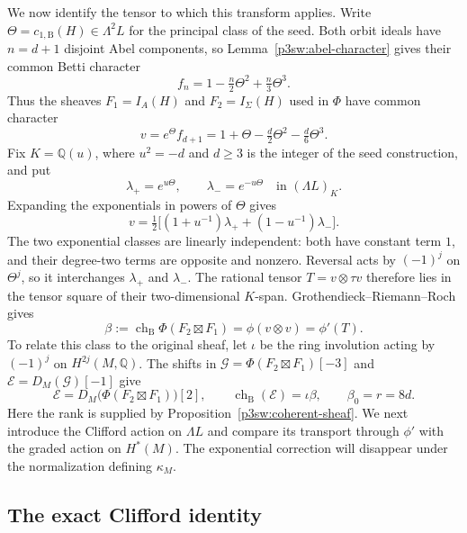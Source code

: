 \documentclass[11pt]{article}
\newcommand{\Q}{\mathbb Q}
\numberwithin{equation}{section}
\begin{document}
We now identify the tensor to which this transform applies.  Write
\(\Theta=c_{1,\mathrm B}(H)\in\Lambda^2L\) for the principal class
of the seed.  Both orbit ideals have \(n=d+1\) disjoint Abel
components, so Lemma~\ref{p3sw:abel-character} gives their common
Betti character
\[
 f_n=1-\tfrac n2\Theta^2+\tfrac n3\Theta^3.
\]
Thus the sheaves \(F_1=I_A(H)\) and \(F_2=I_\Sigma(H)\) used in
\(\Phi\) have common character
\[
 v=e^\Theta f_{d+1}
   =1+\Theta-\tfrac d2\Theta^2-\tfrac d6\Theta^3.
\]
Fix \(K=\Q(u)\), where \(u^2=-d\) and \(d\geq3\) is the integer
of the seed construction, and put
\[
 \lambda_+=e^{u\Theta},\qquad \lambda_-=e^{-u\Theta}
       \quad\text{in }(\Lambda L)_K.
\]
Expanding the exponentials in powers of \(\Theta\) gives
\begin{equation}
\label{p3sw:spin-eq:source-character}
 v=\tfrac12\bigl[(1+u^{-1})\lambda_+
                    +(1-u^{-1})\lambda_-\bigr].
\end{equation}
The two exponential classes are linearly independent: both have
constant term \(1\), and their degree-two terms are opposite and
nonzero.  Reversal acts by \((-1)^j\) on \(\Theta^j\), so it
interchanges \(\lambda_+\) and \(\lambda_-\).  The rational tensor
\(T=v\otimes\tau v\) therefore lies in the tensor square of their
two-dimensional \(K\)-span.  Grothendieck--Riemann--Roch gives
\begin{equation}
\label{p3sw:spin-eq:sheaf-transform}
 \beta:=\operatorname{ch}_{\mathrm B}\Phi(F_2\boxtimes F_1)
       =\phi(v\otimes v)=\phi'(T).
\end{equation}
To relate this class to the original sheaf, let \(\iota\) be the
ring involution acting by \((-1)^j\) on \(H^{2j}(M,\Q)\).
The shifts in \(\mathcal G=\Phi(F_2\boxtimes F_1)[-3]\) and
\(\mathcal E=D_M(\mathcal G)[-1]\) give
\begin{equation}
\label{p3sw:spin-eq:sheaf-duality}
 \mathcal E=D_M\bigl(\Phi(F_2\boxtimes F_1)\bigr)[2],\qquad
 \operatorname{ch}_{\mathrm B}(\mathcal E)=\iota\beta,\qquad
 \beta_0=r=8d.
\end{equation}
Here the rank is supplied by Proposition~\ref{p3sw:coherent-sheaf}.
We next introduce the Clifford action on \(\Lambda L\) and compare
its transport through \(\phi'\) with the graded action on
\(H^*(M)\).  The exponential correction will disappear under the
normalization defining \(\kappa_M\).

\subsection{The exact Clifford identity}
\end{document}
